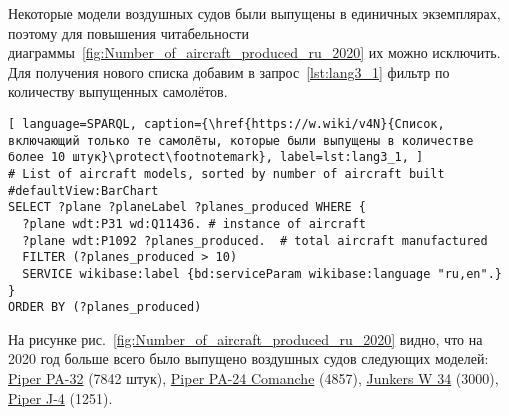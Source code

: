 
Некоторые модели воздушных судов были выпущены в единичных экземплярах, поэтому для повышения читабельности диаграммы~\ref{fig:Number_of_aircraft_produced_ru_2020} их можно исключить. Для получения нового списка добавим в запрос~\ref{lst:lang3_1} фильтр по количеству выпущенных самолётов.


\begin{lstlisting}[ language=SPARQL, caption={\href{https://w.wiki/v4N}{Список, включающий только те самолёты, которые были выпущены в количестве более 10 штук}\protect\footnotemark}, label=lst:lang3_1, ]
# List of aircraft models, sorted by number of aircraft built
#defaultView:BarChart
SELECT ?plane ?planeLabel ?planes_produced WHERE {
  ?plane wdt:P31 wd:Q11436. # instance of aircraft
  ?plane wdt:P1092 ?planes_produced.  # total aircraft manufactured
  FILTER (?planes_produced > 10)
  SERVICE wikibase:label {bd:serviceParam wikibase:language "ru,en".}
}
ORDER BY (?planes_produced)
\end{lstlisting}


\label{aircraft_question_2}

На рисунке рис.~\ref{fig:Number_of_aircraft_produced_ru_2020} видно, что на 2020 год больше всего было выпущено воздушных судов следующих моделей: \href{https://www.wikidata.org/wiki/Q2096452}{Piper PA-32} (\num{7842} штук), \href{https://www.wikidata.org/wiki/Q1860367}{Piper PA-24 Comanche} (\num{4857}), \href{https://www.wikidata.org/wiki/Q694521}{Junkers W 34} (\num{3000}), \href{https://www.wikidata.org/wiki/Q4046989}{Piper J-4} (\num{1251}).


